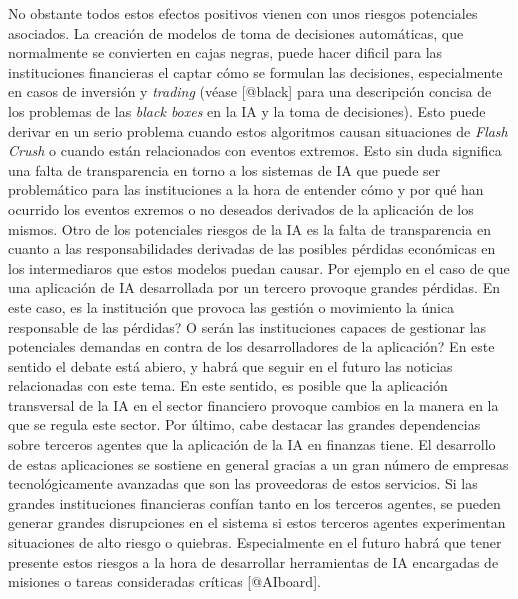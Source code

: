 \documentclass[]{article}
\begin{document}
No obstante todos estos efectos positivos vienen con unos riesgos
potenciales asociados. La creación de modelos de toma de decisiones
automáticas, que normalmente se convierten en cajas negras, puede hacer
dificil para las instituciones financieras el captar cómo se formulan
las decisiones, especialmente en casos de inversión y \emph{trading}
(véase {[}@black{]} para una descripción concisa de los problemas de las
\emph{black boxes} en la IA y la toma de decisiones). Esto puede derivar
en un serio problema cuando estos algoritmos causan situaciones de
\emph{Flash Crush} o cuando están relacionados con eventos extremos.
Esto sin duda significa una falta de transparencia en torno a los
sistemas de IA que puede ser problemático para las instituciones a la
hora de entender cómo y por qué han ocurrido los eventos exremos o no
deseados derivados de la aplicación de los mismos. Otro de los
potenciales riesgos de la IA es la falta de transparencia en cuanto a
las responsabilidades derivadas de las posibles pérdidas económicas en
los intermediaros que estos modelos puedan causar. Por ejemplo en el
caso de que una aplicación de IA desarrollada por un tercero provoque
grandes pérdidas. En este caso, es la institución que provoca las
gestión o movimiento la única responsable de las pérdidas? O serán las
instituciones capaces de gestionar las potenciales demandas en contra de
los desarrolladores de la aplicación? En este sentido el debate está
abiero, y habrá que seguir en el futuro las noticias relacionadas con
este tema. En este sentido, es posible que la aplicación transversal de
la IA en el sector financiero provoque cambios en la manera en la que se
regula este sector. Por último, cabe destacar las grandes dependencias
sobre terceros agentes que la aplicación de la IA en finanzas tiene. El
desarrollo de estas aplicaciones se sostiene en general gracias a un
gran número de empresas tecnológicamente avanzadas que son las
proveedoras de estos servicios. Si las grandes instituciones financieras
confían tanto en los terceros agentes, se pueden generar grandes
disrupciones en el sistema si estos terceros agentes experimentan
situaciones de alto riesgo o quiebras. Especialmente en el futuro habrá
que tener presente estos riesgos a la hora de desarrollar herramientas
de IA encargadas de misiones o tareas consideradas críticas
{[}@AIboard{]}.
\end{document}
